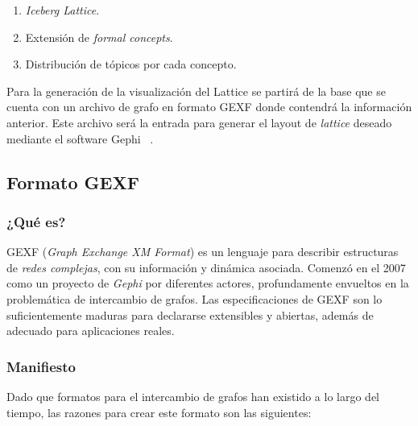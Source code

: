 \documentclass[12pt,oneside,letterpaper]{book}
\newcommand{\eng}[1]{\textit{#1}\xspace}			%
\newcommand{\abr}[1]{\textsc{#1}\xspace}           %
\theoremstyle{definition}
\begin{document}
\begin{enumerate}
	\item \eng{Iceberg Lattice}.
	\item Extensión de \eng{formal concepts}.
	\item Distribución de tópicos por cada concepto.
\end{enumerate}

Para la generación de la visualización del Lattice se partirá de la base que se cuenta con un archivo de grafo en formato \abr{GEXF} donde contendrá la información anterior. Este archivo será la entrada para generar el layout de \eng{lattice} deseado mediante el software Gephi ~\cite{gephi}.


\subsection{Formato \abr{GEXF}}
\label{sub:eng}

\subsubsection{¿Qué es?}
\abr{GEXF} (\eng{Graph Exchange XM Format}) es un lenguaje para describir estructuras de \emph{redes complejas}, con su información y dinámica asociada. Comenzó en el 2007 como un proyecto de \eng{Gephi} por diferentes actores, profundamente envueltos en la problemática de intercambio de grafos. Las especificaciones de \abr{GEXF} son lo suficientemente maduras para declararse extensibles y abiertas, además de adecuado para aplicaciones reales.

\subsubsection{Manifiesto}
Dado que formatos para el intercambio de grafos han existido a lo largo del tiempo, las razones para crear este formato son las siguientes:
\end{document}
